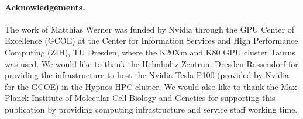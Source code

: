 \paragraph{Acknowledgements.} The work of Matthias Werner was funded by Nvidia through the GPU Center of Excellence (GCOE) at the Center for Information Services and High Performance Computing (ZIH), TU Dresden, where the K20Xm and K80 GPU cluster Taurus was used. We would like to thank the Helmholtz-Zentrum Dresden-Rossendorf for providing the infrastructure to host the Nvidia Tesla P100 (provided by Nvidia for the GCOE) in the Hypnos HPC cluster. We would also like to thank the Max Planck Institute of Molecular Cell Biology and Genetics for supporting this publication by providing computing infrastructure and service staff working time.
